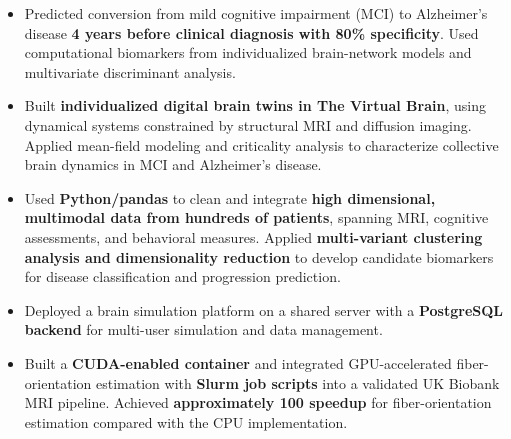{\begin{itemize}
  \end{itemize}
  \par
  \begin{itemize}
    \item Predicted conversion from mild cognitive impairment (MCI) to Alzheimer's disease \textbf{4 years before clinical diagnosis with 80\% specificity}. Used computational biomarkers from individualized brain-network models and multivariate discriminant analysis.
    \item Built \textbf{individualized digital brain twins in The Virtual Brain}, using dynamical systems constrained by structural MRI and diffusion imaging. Applied mean-field modeling and criticality analysis to characterize collective brain dynamics in MCI and Alzheimer's disease.
    \item Used \textbf{Python/pandas} to clean and integrate \textbf{high dimensional, multimodal data from hundreds of patients}, spanning MRI, cognitive assessments, and behavioral measures. Applied \textbf{multi-variant clustering analysis and dimensionality reduction} to develop candidate biomarkers for disease classification and progression prediction.
  \end{itemize}
  \entrygap
  \begin{itemize}
    \item Deployed a brain simulation platform on a shared server with a \textbf{PostgreSQL backend} for multi-user simulation and data management.
    \item Built a \textbf{CUDA-enabled container} and integrated GPU-accelerated fiber-orientation estimation with \textbf{Slurm job scripts} into a validated UK Biobank MRI pipeline. Achieved \textbf{approximately 100\texttimes{} speedup} for fiber-orientation estimation compared with the CPU implementation.
  \end{itemize}}


